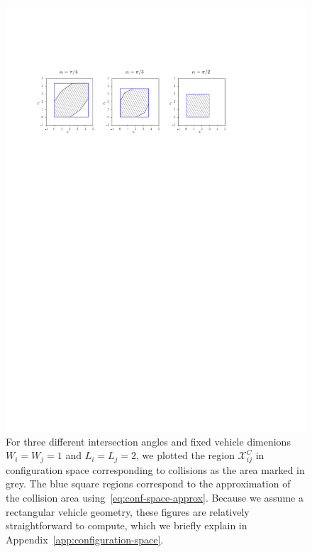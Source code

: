 \documentclass[a4paper]{report}
\theoremstyle{definition}
\theoremstyle{plain}
\begin{document}
\begin{figure}
  \centering
  \includegraphics[scale=1]{figures/intersection-config-spaces}
  \caption{For three different intersection angles and fixed vehicle dimenions
    $W_{i} = W_{j} = 1$ and $L_{i} = L_{j} = 2$, we plotted the region
    $\mathcal{X}_{ij}^{C}$ in configuration space corresponding to collisions as
    the area marked in grey. The blue square regions correspond to the
    approximation of the collision area using~\eqref{eq:conf-space-approx}. Because we assume a
    rectangular vehicle geometry, these figures are relatively straightforward
    to compute, which we briefly explain in
    Appendix~\ref{app:configuration-space}.}%
  \label{fig:intersection-config-spaces}
\end{figure}
\end{document}
